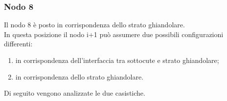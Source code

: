 \subsubsection*{Nodo 8}
Il nodo 8 è posto in corrispondenza dello strato ghiandolare.\\
In questa posizione il nodo i+1 può assumere due possibili configurazioni differenti:
\begin{enumerate}
    \item in corrispondenza dell'interfaccia tra sottocute e strato ghiandolare;
    \item in corrispondenza dello strato ghiandolare.
\end{enumerate}
Di seguito vengono analizzate le due casistiche.
